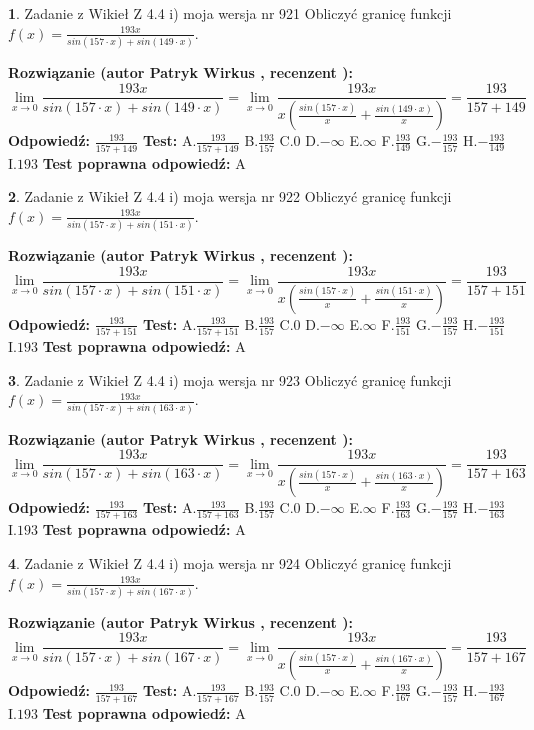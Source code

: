 \documentclass[12pt, a4paper]{article}
\theoremstyle{definition} %
\newtheorem{zad}{}
\newcommand{\zadStart}[1]{\begin{zad}#1\newline}
\newcommand{\zadStop}{\end{zad}}
\newcommand{\rozwStart}[2]{\noindent \textbf{Rozwiązanie (autor #1 , recenzent #2): }\newline}
\newcommand{\rozwStop}{\newline}
\newcommand{\odpStart}{\noindent \textbf{Odpowiedź:}\newline}
\newcommand{\odpStop}{\newline}
\newcommand{\testStart}{\noindent \textbf{Test:}\newline}
\newcommand{\testStop}{\newline}
\newcommand{\kluczStart}{\noindent \textbf{Test poprawna odpowiedź:}\newline}
\newcommand{\kluczStop}{\newline}
\begin{document}
\zadStart{Zadanie z Wikieł Z 4.4 i) moja wersja nr 921}
Obliczyć granicę funkcji $f(x)=\frac{193x}{sin(157\cdot x) +sin(149\cdot x)}$.
\zadStop
\rozwStart{Patryk Wirkus}{}
$$\lim\limits_{x\to 0}\frac{193x}{sin(157\cdot x) +sin(149\cdot x)}=\lim\limits_{x\to 0}\frac{193x}{x(\frac{sin(157\cdot x)}{x}+\frac{sin(149\cdot x)}{x})}=\frac{193}{157+149}$$
\rozwStop
\odpStart
$\frac{193}{157+149}$
\odpStop
\testStart
A.$\frac{193}{157+149}$
B.$\frac{193}{157}$
C.$0$
D.$-\infty$
E.$\infty$
F.$\frac{193}{149}$
G.$-\frac{193}{157}$
H.$-\frac{193}{149}$
I.$193$
\testStop
\kluczStart
A
\kluczStop



\zadStart{Zadanie z Wikieł Z 4.4 i) moja wersja nr 922}
Obliczyć granicę funkcji $f(x)=\frac{193x}{sin(157\cdot x) +sin(151\cdot x)}$.
\zadStop
\rozwStart{Patryk Wirkus}{}
$$\lim\limits_{x\to 0}\frac{193x}{sin(157\cdot x) +sin(151\cdot x)}=\lim\limits_{x\to 0}\frac{193x}{x(\frac{sin(157\cdot x)}{x}+\frac{sin(151\cdot x)}{x})}=\frac{193}{157+151}$$
\rozwStop
\odpStart
$\frac{193}{157+151}$
\odpStop
\testStart
A.$\frac{193}{157+151}$
B.$\frac{193}{157}$
C.$0$
D.$-\infty$
E.$\infty$
F.$\frac{193}{151}$
G.$-\frac{193}{157}$
H.$-\frac{193}{151}$
I.$193$
\testStop
\kluczStart
A
\kluczStop



\zadStart{Zadanie z Wikieł Z 4.4 i) moja wersja nr 923}
Obliczyć granicę funkcji $f(x)=\frac{193x}{sin(157\cdot x) +sin(163\cdot x)}$.
\zadStop
\rozwStart{Patryk Wirkus}{}
$$\lim\limits_{x\to 0}\frac{193x}{sin(157\cdot x) +sin(163\cdot x)}=\lim\limits_{x\to 0}\frac{193x}{x(\frac{sin(157\cdot x)}{x}+\frac{sin(163\cdot x)}{x})}=\frac{193}{157+163}$$
\rozwStop
\odpStart
$\frac{193}{157+163}$
\odpStop
\testStart
A.$\frac{193}{157+163}$
B.$\frac{193}{157}$
C.$0$
D.$-\infty$
E.$\infty$
F.$\frac{193}{163}$
G.$-\frac{193}{157}$
H.$-\frac{193}{163}$
I.$193$
\testStop
\kluczStart
A
\kluczStop



\zadStart{Zadanie z Wikieł Z 4.4 i) moja wersja nr 924}
Obliczyć granicę funkcji $f(x)=\frac{193x}{sin(157\cdot x) +sin(167\cdot x)}$.
\zadStop
\rozwStart{Patryk Wirkus}{}
$$\lim\limits_{x\to 0}\frac{193x}{sin(157\cdot x) +sin(167\cdot x)}=\lim\limits_{x\to 0}\frac{193x}{x(\frac{sin(157\cdot x)}{x}+\frac{sin(167\cdot x)}{x})}=\frac{193}{157+167}$$
\rozwStop
\odpStart
$\frac{193}{157+167}$
\odpStop
\testStart
A.$\frac{193}{157+167}$
B.$\frac{193}{157}$
C.$0$
D.$-\infty$
E.$\infty$
F.$\frac{193}{167}$
G.$-\frac{193}{157}$
H.$-\frac{193}{167}$
I.$193$
\testStop
\kluczStart
A
\kluczStop
\end{document}
